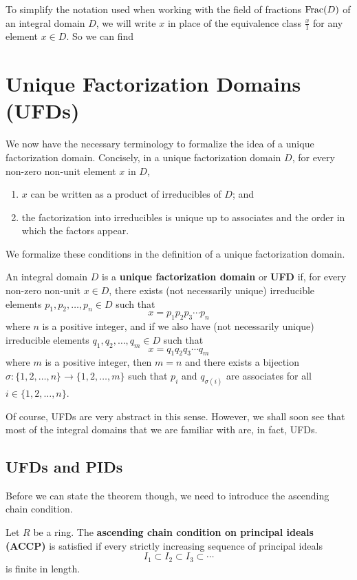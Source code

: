 To simplify the notation used when working with the field of fractions $\mathrm{Frac}(D)$ of an integral domain $D$, we will write $x$ in place of the equivalence class $\frac x1$ for any element $x \in D$. So we can find

\section{Unique Factorization Domains (UFDs)}
We now have the necessary terminology to formalize the idea of a unique factorization domain. Concisely, in a unique factorization domain $D$, for every non-zero non-unit element $x$ in $D$,
\begin{enumerate}
    \item $x$ can be written as a product of irreducibles of $D$; and
    \item the factorization into irreducibles is unique up to associates and the order in which the factors appear.
\end{enumerate}

We formalize these conditions in the definition of a unique factorization domain.

\begin{definition}
    An integral domain $D$ is a \textbf{unique factorization domain} or \textbf{UFD} if, for every non-zero non-unit $x \in D$, there exists (not necessarily unique) irreducible elements $p_1, p_2, \dots, p_n \in D$ such that
    \[
        x = p_1p_2p_3\cdots p_n
    \]
    where $n$ is a positive integer, and if we also have (not necessarily unique) irreducible elements $q_1, q_2, \dots, q_m \in D$ such that
    \[
        x = q_1q_2q_3\cdots q_m
    \]
    where $m$ is a positive integer, then $m = n$ and there exists a bijection $\sigma: \{1,2,\dots,n\} \to \{1,2,\dots,m\}$ such that $p_i$ and $q_{\sigma(i)}$ are associates for all $i \in \{1,2,\dots,n\}$.
\end{definition}

Of course, UFDs are very abstract in this sense. However, we shall soon see that most of the integral domains that we are familiar with are, in fact, UFDs.

\subsection{UFDs and PIDs}
Before we can state the theorem though, we need to introduce the ascending chain condition.

\begin{definition}
    Let $R$ be a ring. The \textbf{ascending chain condition on principal ideals (ACCP)} is satisfied if every strictly increasing sequence of principal ideals 
    \[
        I_1 \subset I_2 \subset I_3 \subset \cdots
    \]
    is finite in length.
\end{definition}

